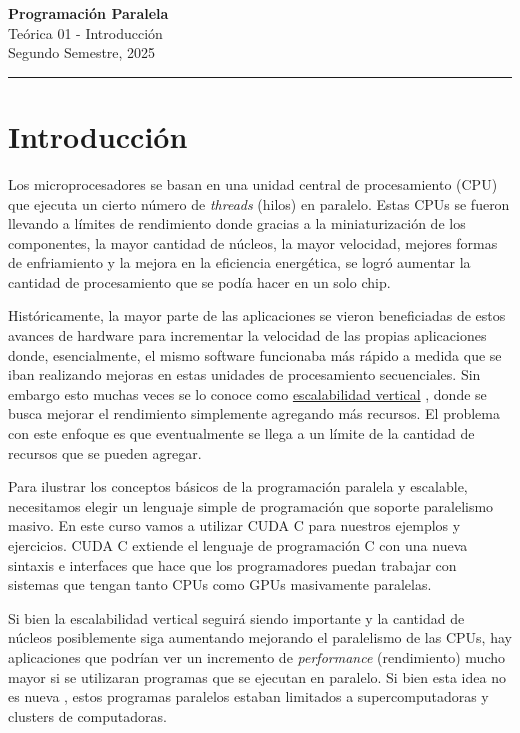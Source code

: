 



\begin{center}
    \LARGE\textbf{Programación Paralela} \\
    \Large{Teórica 01 - Introducción} \\
    \normalsize{Segundo Semestre, 2025} \\
    \vspace{1em}
    \hrule
\end{center}

\vspace{1em}


\section*{Introducción}


Los microprocesadores se basan en una unidad central de procesamiento (CPU) que ejecuta un cierto número de
\textit{threads} (hilos) en paralelo. Estas CPUs se fueron llevando a límites de rendimiento donde gracias a la
miniaturización de los componentes, la mayor cantidad de núcleos, la mayor velocidad, mejores formas de enfriamiento y
la mejora en la eficiencia energética, se logró aumentar la cantidad de procesamiento que se podía hacer en un solo
chip.

Históricamente, la mayor parte de las aplicaciones se vieron beneficiadas de estos avances de hardware para incrementar
la velocidad de las propias aplicaciones donde, esencialmente, el mismo software funcionaba más rápido a medida que se
iban realizando mejoras en estas unidades de procesamiento secuenciales. Sin embargo esto muchas veces se lo conoce como
\href{https://es.wikipedia.org/wiki/Escalabilidad#Escalabilidad_vertical}{escalabilidad vertical} , donde se busca
mejorar el rendimiento simplemente agregando más recursos. El problema con este enfoque es que eventualmente se llega a
un límite de la cantidad de recursos que se pueden agregar.

Para ilustrar los conceptos básicos de la programación paralela y escalable, necesitamos elegir un lenguaje simple de
programación que soporte paralelismo masivo. En este curso vamos a utilizar CUDA C para nuestros ejemplos y ejercicios.
CUDA C extiende el lenguaje de programación C con una nueva sintaxis e interfaces que hace que los programadores puedan
trabajar con sistemas que tengan tanto CPUs como GPUs masivamente paralelas.

Si bien la escalabilidad vertical seguirá siendo importante y la cantidad de núcleos posiblemente siga aumentando
mejorando el paralelismo de las CPUs, hay aplicaciones que podrían ver un incremento de \textit{performance}
(rendimiento) mucho mayor si se utilizaran programas que se ejecutan en paralelo. Si bien esta idea no es nueva
\cite{sutter2005}, estos programas paralelos estaban limitados a supercomputadoras y clusters de computadoras.

